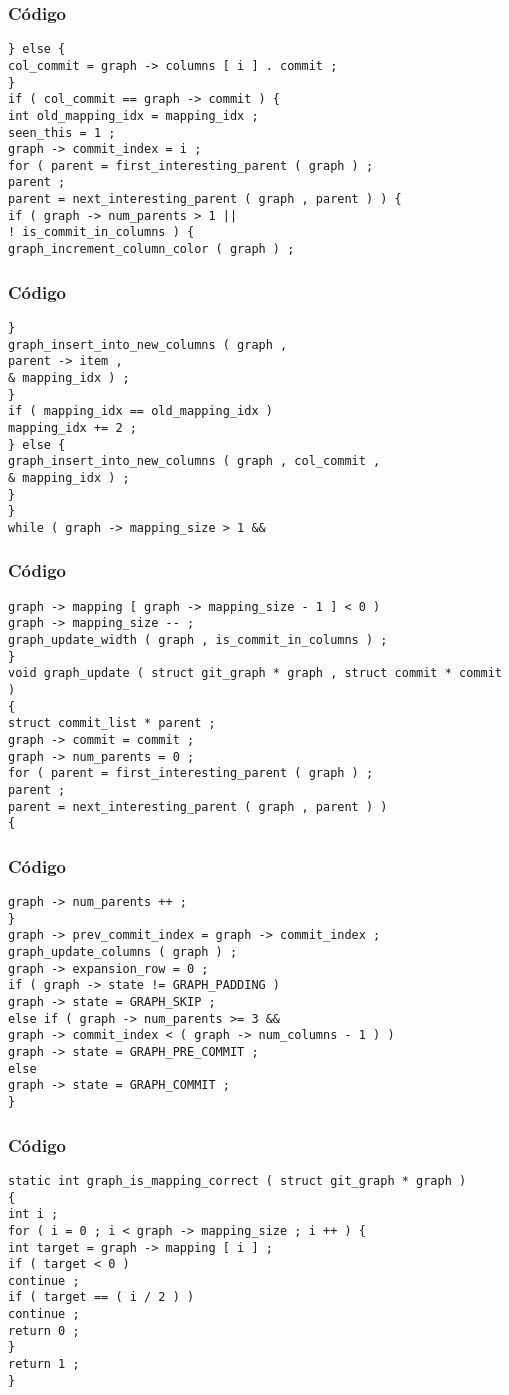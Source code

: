 \documentclass{beamer}
\begin{document}
\begin{frame}[fragile]
\frametitle{C\'odigo}
\begin{verbatim}
} else { 
col_commit = graph -> columns [ i ] . commit ; 
} 
if ( col_commit == graph -> commit ) { 
int old_mapping_idx = mapping_idx ; 
seen_this = 1 ; 
graph -> commit_index = i ; 
for ( parent = first_interesting_parent ( graph ) ; 
parent ; 
parent = next_interesting_parent ( graph , parent ) ) { 
if ( graph -> num_parents > 1 || 
! is_commit_in_columns ) { 
graph_increment_column_color ( graph ) ; 
\end{verbatim}
\end{frame}
\begin{frame}[fragile]
\frametitle{C\'odigo}
\begin{verbatim}
} 
graph_insert_into_new_columns ( graph , 
parent -> item , 
& mapping_idx ) ; 
} 
if ( mapping_idx == old_mapping_idx ) 
mapping_idx += 2 ; 
} else { 
graph_insert_into_new_columns ( graph , col_commit , 
& mapping_idx ) ; 
} 
} 
while ( graph -> mapping_size > 1 && 
\end{verbatim}
\end{frame}
\begin{frame}[fragile]
\frametitle{C\'odigo}
\begin{verbatim}
graph -> mapping [ graph -> mapping_size - 1 ] < 0 ) 
graph -> mapping_size -- ; 
graph_update_width ( graph , is_commit_in_columns ) ; 
} 
void graph_update ( struct git_graph * graph , struct commit * commit ) 
{ 
struct commit_list * parent ; 
graph -> commit = commit ; 
graph -> num_parents = 0 ; 
for ( parent = first_interesting_parent ( graph ) ; 
parent ; 
parent = next_interesting_parent ( graph , parent ) ) 
{ 
\end{verbatim}
\end{frame}
\begin{frame}[fragile]
\frametitle{C\'odigo}
\begin{verbatim}
graph -> num_parents ++ ; 
} 
graph -> prev_commit_index = graph -> commit_index ; 
graph_update_columns ( graph ) ; 
graph -> expansion_row = 0 ; 
if ( graph -> state != GRAPH_PADDING ) 
graph -> state = GRAPH_SKIP ; 
else if ( graph -> num_parents >= 3 && 
graph -> commit_index < ( graph -> num_columns - 1 ) ) 
graph -> state = GRAPH_PRE_COMMIT ; 
else 
graph -> state = GRAPH_COMMIT ; 
} 
\end{verbatim}
\end{frame}
\begin{frame}[fragile]
\frametitle{C\'odigo}
\begin{verbatim}
static int graph_is_mapping_correct ( struct git_graph * graph ) 
{ 
int i ; 
for ( i = 0 ; i < graph -> mapping_size ; i ++ ) { 
int target = graph -> mapping [ i ] ; 
if ( target < 0 ) 
continue ; 
if ( target == ( i / 2 ) ) 
continue ; 
return 0 ; 
} 
return 1 ; 
} 
\end{verbatim}
\end{frame}
\end{document}
